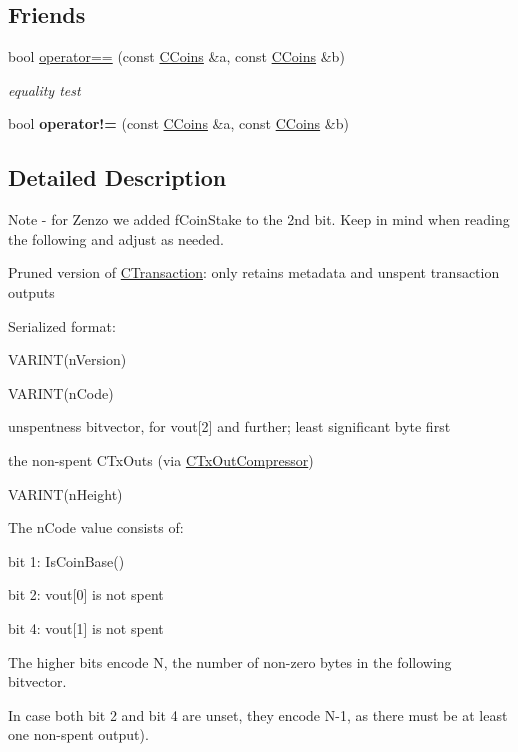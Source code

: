 \subsection*{Friends}
\begin{DoxyCompactItemize}
\item 
\mbox{\label{class_c_coins_a77593e3db3e4b369c21a91aad2afcc05}} 
bool \mbox{\hyperlink{class_c_coins_a77593e3db3e4b369c21a91aad2afcc05}{operator==}} (const \mbox{\hyperlink{class_c_coins}{C\+Coins}} \&a, const \mbox{\hyperlink{class_c_coins}{C\+Coins}} \&b)
\begin{DoxyCompactList}\small\item\em equality test \end{DoxyCompactList}\item 
\mbox{\label{class_c_coins_a42ef9fcc8ca59916b5fb69904db1c9bd}} 
bool {\bfseries operator!=} (const \mbox{\hyperlink{class_c_coins}{C\+Coins}} \&a, const \mbox{\hyperlink{class_c_coins}{C\+Coins}} \&b)
\end{DoxyCompactItemize}


\subsection{Detailed Description}
\begin{DoxyVerb}Note - for Zenzo we added fCoinStake to the 2nd bit. Keep in mind when reading the following and adjust as needed.
\end{DoxyVerb}
 Pruned version of \mbox{\hyperlink{class_c_transaction}{C\+Transaction}}\+: only retains metadata and unspent transaction outputs

Serialized format\+:
\begin{DoxyItemize}
\item V\+A\+R\+I\+N\+T(n\+Version)
\item V\+A\+R\+I\+N\+T(n\+Code)
\item unspentness bitvector, for vout\mbox{[}2\mbox{]} and further; least significant byte first
\item the non-\/spent C\+Tx\+Outs (via \mbox{\hyperlink{class_c_tx_out_compressor}{C\+Tx\+Out\+Compressor}})
\item V\+A\+R\+I\+N\+T(n\+Height)
\end{DoxyItemize}

The n\+Code value consists of\+:
\begin{DoxyItemize}
\item bit 1\+: Is\+Coin\+Base()
\item bit 2\+: vout\mbox{[}0\mbox{]} is not spent
\item bit 4\+: vout\mbox{[}1\mbox{]} is not spent
\item The higher bits encode N, the number of non-\/zero bytes in the following bitvector.
\begin{DoxyItemize}
\item In case both bit 2 and bit 4 are unset, they encode N-\/1, as there must be at least one non-\/spent output).
\end{DoxyItemize}
\end{DoxyItemize}

